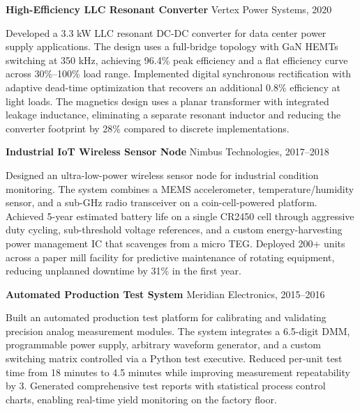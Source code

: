 \documentclass[11pt,letterpaper]{article}
\begin{document}
\vspace{0.35cm}

\noindent
\textbf{\color{primary}High-Efficiency LLC Resonant Converter} \hfill \small\color{primary!70}Vertex Power Systems, 2020

\vspace{3pt}
Developed a 3.3 kW LLC resonant DC-DC converter for data center power supply applications. The design uses a full-bridge topology with GaN HEMTs switching at 350 kHz, achieving 96.4\% peak efficiency and a flat efficiency curve across 30\%--100\% load range. Implemented digital synchronous rectification with adaptive dead-time optimization that recovers an additional 0.8\% efficiency at light loads. The magnetics design uses a planar transformer with integrated leakage inductance, eliminating a separate resonant inductor and reducing the converter footprint by 28\% compared to discrete implementations.

\vspace{0.35cm}

\noindent
\textbf{\color{primary}Industrial IoT Wireless Sensor Node} \hfill \small\color{primary!70}Nimbus Technologies, 2017--2018

\vspace{3pt}
Designed an ultra-low-power wireless sensor node for industrial condition monitoring. The system combines a MEMS accelerometer, temperature/humidity sensor, and a sub-GHz radio transceiver on a coin-cell-powered platform. Achieved 5-year estimated battery life on a single CR2450 cell through aggressive duty cycling, sub-threshold voltage references, and a custom energy-harvesting power management IC that scavenges from a micro TEG. Deployed 200+ units across a paper mill facility for predictive maintenance of rotating equipment, reducing unplanned downtime by 31\% in the first year.

\vspace{0.35cm}

\noindent
\textbf{\color{primary}Automated Production Test System} \hfill \small\color{primary!70}Meridian Electronics, 2015--2016

\vspace{3pt}
Built an automated production test platform for calibrating and validating precision analog measurement modules. The system integrates a 6.5-digit DMM, programmable power supply, arbitrary waveform generator, and a custom switching matrix controlled via a Python test executive. Reduced per-unit test time from 18 minutes to 4.5 minutes while improving measurement repeatability by 3\texttimes. Generated comprehensive test reports with statistical process control charts, enabling real-time yield monitoring on the factory floor.
\end{document}
